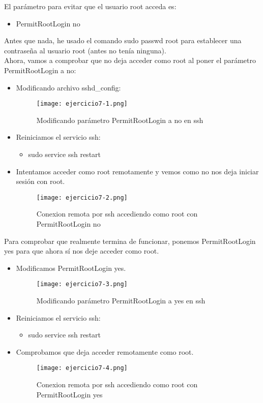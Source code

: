 	El parámetro para evitar que el usuario root acceda\cite{ejercicio7-2} es:
	\begin{itemize}
		\item PermitRootLogin no
	\end{itemize}
	
	Antes que nada, he usado el comando sudo passwd root para establecer una contraseña al usuario root (antes no tenía ninguna).
	\\
	
	Ahora, vamos a comprobar que no deja acceder como root al poner el parámetro PermitRootLogin a no:
		\begin{itemize}
		\item Modificando archivo sshd\_config:
			\begin{figure}[H]	
				\centering
				\texttt{[image: ejercicio7-1.png]} 
				\label{figura56} 
				\caption{Modificando parámetro PermitRootLogin a no en ssh}
			\end{figure}
		\item Reiniciamos el servicio ssh:
			\begin{itemize}
				\item sudo service ssh restart
			\end{itemize}		
		\item Intentamos acceder como root remotamente y vemos como no nos deja iniciar sesión con root.
			\begin{figure}[H]	
				\centering
				\texttt{[image: ejercicio7-2.png]} 
				\label{figura57} 
				\caption{Conexion remota por ssh accediendo como root con PermitRootLogin no}
			\end{figure}
		\end{itemize}
	
	Para comprobar que realmente termina de funcionar, ponemos PermitRootLogin yes para que ahora sí nos deje acceder como root.
	\begin{itemize}
		\item Modificamos PermitRootLogin yes. 
			\begin{figure}[H]	
				\centering
				\texttt{[image: ejercicio7-3.png]} 
				\label{figura58} 
				\caption{Modificando parámetro PermitRootLogin a yes en ssh}
			\end{figure}
		\item Reiniciamos el servicio ssh:
		\begin{itemize}
			\item sudo service ssh restart
		\end{itemize}	 
		\item Comprobamos que deja acceder remotamente como root.
			\begin{figure}[H]	
				\centering
				\texttt{[image: ejercicio7-4.png]} 
				\label{figura59} 
				\caption{Conexion remota por ssh accediendo como root con PermitRootLogin yes}
			\end{figure}
	\end{itemize}
	
